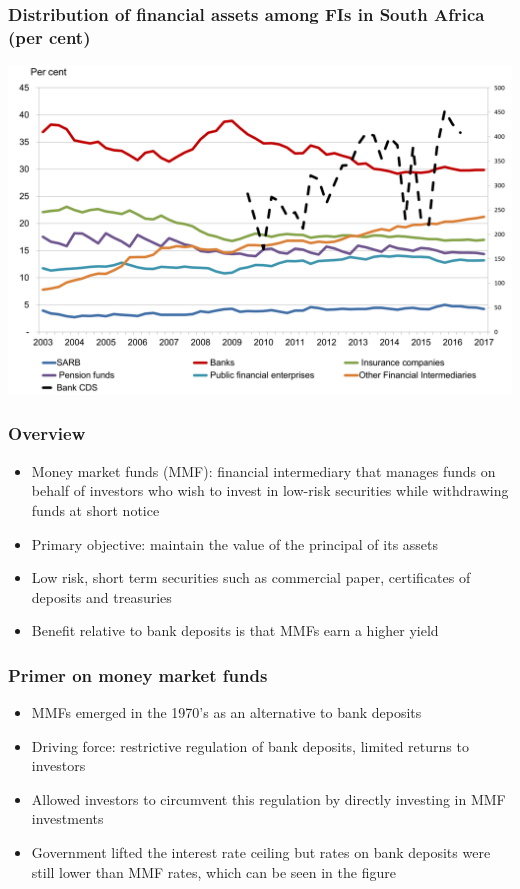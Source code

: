 \documentclass[11pt]{beamer}
\begin{document}
\begin{frame}
\frametitle{Distribution of financial assets among FIs in South Africa (per cent)}
\includegraphics[width=\textwidth]{shadowbank8.png}
\end{frame}



\begin{frame}
\begin{center}
\end{center}
\end{frame}

\begin{frame}
\frametitle{Overview}
\begin{itemize}
\item Money market funds (MMF): financial intermediary that manages funds on behalf of investors who wish to invest in low-risk securities while withdrawing funds at short notice
\item Primary objective: maintain the value of the principal of its assets
\item Low risk, short term securities such as commercial paper, certificates of deposits and treasuries
\item Benefit relative to bank deposits is that MMFs earn a higher yield
\end{itemize}
\end{frame}


\begin{frame}
\frametitle{Primer on money market funds}
\begin{itemize}
\item MMFs emerged in the 1970's as an alternative to bank deposits
\item Driving force: restrictive regulation of bank deposits, limited returns to investors
\item Allowed investors to circumvent this regulation by directly investing in MMF investments
\item Government lifted the interest rate ceiling but rates on bank deposits were still lower than MMF rates, which can be seen in the figure
\end{itemize}
\end{frame}
\end{document}

